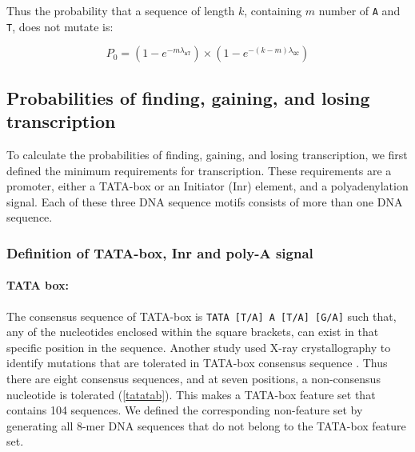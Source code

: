 \documentclass[12pt,a4paper]{article}
\begin{document}
\vspace{1\baselineskip}

Thus the probability that a sequence of length $k$, containing $m$ number of \texttt{A} and \texttt{T}, does not mutate is:

\vspace{-1ex}

$$P_0 = (1-e^{-m\lambda_\texttt{AT}})\times(1-e^{-(k-m)\lambda_\texttt{GC}})$$

\subsection{Probabilities of finding, gaining, and losing transcription}

\label{methRNA}
To calculate the probabilities of finding, gaining, and losing transcription, we first defined the minimum requirements for transcription. These requirements are a promoter, either a TATA-box or an Initiator (Inr) element, and a polyadenylation signal. Each of these three DNA sequence motifs consists of more than one DNA sequence.

\subsubsection{Definition of TATA-box, Inr and poly-A signal}

\paragraph{TATA box:}

The consensus sequence of TATA-box is \texttt{TATA [T/A] A [T/A] [G/A]} \citep{tata2} such that, any of the nucleotides enclosed within the square brackets, can exist in that specific position in the sequence. Another study used X-ray crystallography to identify mutations that are tolerated in TATA-box consensus sequence \citep{tata1}. Thus there are eight consensus sequences, and at seven positions, a non-consensus nucleotide is tolerated (\autoref{tatatab}). This makes a TATA-box feature set that contains 104 sequences. We defined the corresponding non-feature set by generating all 8-mer DNA sequences that do not belong to the TATA-box feature set.
\end{document}
